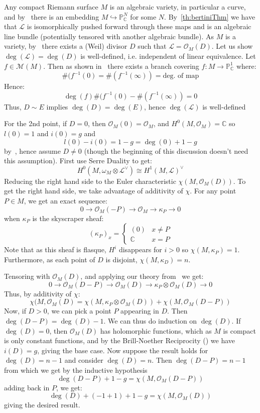 \documentclass{book}
\newenvironment{Proof}[1][]
  {\begin{ProofTcb}[#1]}
  {\end{ProofTcb}}
\newcommand{\C}{{\mathbb{C}}}
\renewcommand{\P}{{\mathbb{P}}}
\newcommand{\CM}{{\mathcal{M}}}
\newcommand{\CL}{{\mathcal{L}}}
\newcommand{\CO}{{\mathcal{O}}}
\renewcommand{\deg}{{\operatorname{deg}}}
\begin{document}
\begin{Proof}
  Any compact Riemann surface $M$ is an algebraic
  variety, in particular a curve, and by~\cite[section~6.1]{NateAlgGeo} there is an embedding $M
  \hookrightarrow \P_\C^N$ for some $N$. By~\cref{th:bertiniThm} we have
  that $\CL$ is isomorphically pushed forward through these maps and is an algebraic line bundle (potentially
  tensored with another algebraic bundle). As $M$ is
  a variety, by~\cite[section~4.3]{NateAlgGeo} there exists a (Weil) divisor $D$ such that $\CL = \CO_M(D)$.
  Let us show $\deg(\CL) = \deg(D)$ is well-defined, i.e. independent of linear equivalence. Let $f \in
  \CM(M)$. Then as shown in~\cite[section~6.3]{NateComplexAnalysis} there exists a branch covering $f: M \to
  \P_\C^1$ where:
  \[
    \#(f^{-1}(0) = \#(f^{-1}(\infty)) = \text{deg. of map}
  \]
  Hence:
  \[
    \deg(f) \#(f^{-1}(0) - \#(f^{-1}(\infty)) = 0
  \]
  Thus, $D\sim E$ implies $\deg(D) = \deg(E)$, hence $\deg(\CL)$ is well-defined

  For the 2nd point, if $D = 0$, then $\CO_M(0) = \CO_M$, and $H^0(M, \CO_M) = \C$ so $l(0) = 1$ and $i(0) =
  g$ and
  \[
    l(0) - i(0) = 1-g = \deg(0) + 1-g
  \]
  by~\cite[section~6.3]{NateComplexAnalysis}, hence assume $D \ne 0$ (though the beginning of this discussion
  doesn't need this assumption). First use Serre Duality to get:
  \[
    H^0(M, \omega_M\otimes \CL^\vee) \cong H^1(M, \CL)^\vee
  \]
  Reducing the right hand side to the Euler characteristic $\chi(M, \CO_M(D))$. To get the right hand side, we
  take advantage of additivity of $\chi$. For any point $P \in M$, we get an exact sequence:
  \[
    0 \to \CO_M(-P) \to \CO_M \to \kappa_P \to 0
  \]
  when $\kappa_P$ is the skyscraper sheaf:
  \[
    (\kappa_P)_x = \begin{cases}
      (0) & x \ne P\\
      \C & x = P
    \end{cases}
  \]
  Note that as this sheaf is flasque, $H^i$ disappears for $i > 0$ so $\chi(M, \kappa_P) = 1$. Furthermore, as
  each point of $D$ is disjoint, $\chi(M, \kappa_D) = n$.


  Tensoring with $\CO_M(D)$, and applying our theory from~\cite[section~4.3]{NateAlgGeo} we get:
  \[
    0 \to \CO_M(D-P) \to \CO_M(D) \to \kappa_P \otimes \CO_M(D) \to 0
  \]
  Thus, by additivity of $\chi$:
  \[
    \chi(M, \CO_M(D) = \chi(M, \kappa_P\otimes \CO_M(D)) + \chi(M, \CO_M(D-P))
  \]
  Now, if $D > 0$, we can pick a point $P$ appearing in $D$. Then $\deg(D-P) = \deg(D)-1$. We can thus do
  induction on $\deg(D)$.  If $\deg(D) = 0$, then $\CO_M(D)$ has holomorphic functions, which as $M$ is
  compact is only constant functions, and by the Brill-Noether Reciprocity (\cite{NateComplexAnalysis}) we
  have $i(D) = g$, giving the base case. Now suppose the result holds for $\deg(D) = n-1$ and consider
  $\deg(D) = n$. Then $\deg(D-P) = n-1$ from which we get by the inductive hypothesis
  \[
    \deg(D-P)+1-g = \chi(M, \CO_M(D-P))
  \]
  adding back in $P$, we get:
  \[
    \deg(D)+(-1+1)+1-g = \chi(M, \CO_M(D))
  \]
  giving the desired result.


\end{Proof}
\end{document}
